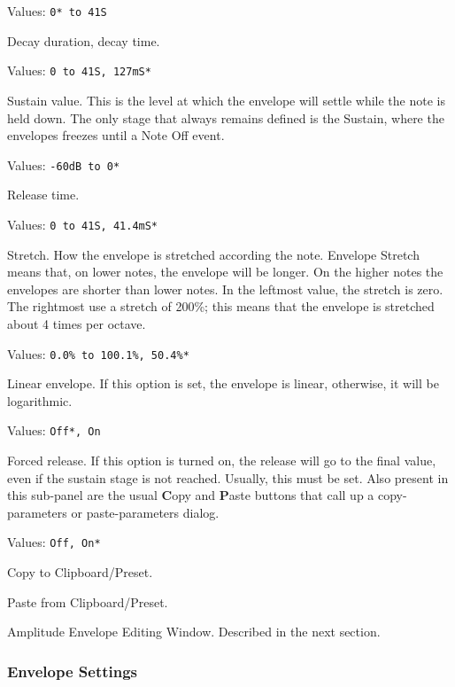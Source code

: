    Values: \texttt{0* to 41S}

   Decay duration, decay time.

   Values: \texttt{0 to 41S, 127mS*}

   Sustain value.
   This is the level at which the envelope will settle while the note is held down.
   The only stage that always remains defined is the Sustain, where the
   envelopes freezes until a Note Off event.

   Values: \texttt{-60dB to 0*}

   Release time.

   Values: \texttt{0 to 41S, 41.4mS*}

   Stretch.
   How the envelope is stretched according the note.
   Envelope Stretch means that, on lower notes, the envelope will be longer.
   On the higher notes the envelopes are shorter than lower notes. In the
   leftmost value, the stretch is zero. The rightmost use a stretch of 200\%;
   this means that the envelope is stretched about 4 times per octave.

   Values: \texttt{0.0\% to 100.1\%, 50.4\%*}

   Linear envelope.
   If this option is set, the envelope is linear, otherwise, it will be
   logarithmic.

   Values: \texttt{Off*, On}

   Forced release.
   If this option is turned on, the release will go to the final value, even
   if the sustain stage is not reached. Usually, this must be set.
   Also present in this sub-panel are the usual \textbf{C}opy
   and \textbf{P}aste buttons that call up a copy-parameters or
   paste-parameters dialog.

   Values: \texttt{Off, On*}

   Copy to Clipboard/Preset.

   Paste from Clipboard/Preset.

   Amplitude Envelope Editing Window.
   Described in the next section.

\subsubsection{Envelope Settings}
\label{subsubsec:envelope_settings}

